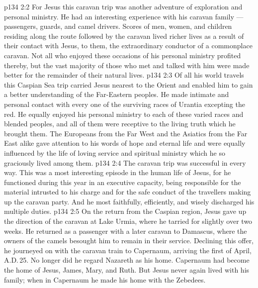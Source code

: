 \vs p134 2:2 For Jesus this caravan trip was another adventure of exploration and personal ministry. He had an interesting experience with his caravan family --- passengers, guards, and camel drivers. Scores of men, women, and children residing along the route followed by the caravan lived richer lives as a result of their contact with Jesus, to them, the extraordinary conductor of a commonplace caravan. Not all who enjoyed these occasions of his personal ministry profited thereby, but the vast majority of those who met and talked with him were made better for the remainder of their natural lives.
\vs p134 2:3 Of all his world travels this Caspian Sea trip carried Jesus nearest to the Orient and enabled him to gain a better understanding of the Far\hyp{}Eastern peoples. He made intimate and personal contact with every one of the surviving races of Urantia excepting the red. He equally enjoyed his personal ministry to each of these varied races and blended peoples, and all of them were receptive to the living truth which he brought them. The Europeans from the Far West and the Asiatics from the Far East alike gave attention to his words of hope and eternal life and were equally influenced by the life of loving service and spiritual ministry which he so graciously lived among them.
\vs p134 2:4 \pc The caravan trip was successful in every way. This was a most interesting episode in the human life of Jesus, for he functioned during this year in an executive capacity, being responsible for the material intrusted to his charge and for the safe conduct of the travellers making up the caravan party. And he most faithfully, efficiently, and wisely discharged his multiple duties.
\vs p134 2:5 On the return from the Caspian region, Jesus gave up the direction of the caravan at Lake Urmia, where he tarried for slightly over two weeks. He returned as a passenger with a later caravan to Damascus, where the owners of the camels besought him to remain in their service. Declining this offer, he journeyed on with the caravan train to Capernaum, arriving the first of April, A.D.\,25. No longer did he regard Nazareth as his home. Capernaum had become the home of Jesus, James, Mary, and Ruth. But Jesus never again lived with his family; when in Capernaum he made his home with the Zebedees.
